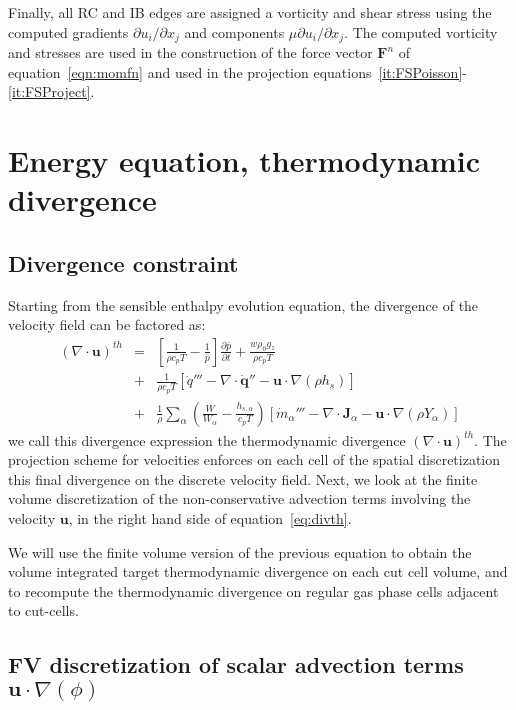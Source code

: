 Finally, all RC and IB edges are assigned a vorticity and shear stress using the computed gradients $\partial u_i/\partial x_j$ and components $\mu \partial u_i/\partial x_j$. The computed vorticity and stresses are used in the construction of the force vector $\mathbf{F}^n$ of equation~\eqref{eqn:momfn} and used in the projection equations~\eqref{it:FSPoisson}-\eqref{it:FSProject}.

\section{Energy equation, thermodynamic divergence}

\subsection{Divergence constraint}

Starting from the sensible enthalpy evolution equation, the divergence of the velocity field can be factored as:
%
\begin{eqnarray}
    ( \nabla \cdot \mathbf{u} )^{th} &=&
    \left[ \frac{1}{\rho c_p T} - \frac{1}{\bar{p}} \right]
    \frac{\partial \bar{p}}{\partial t} + \frac{w \rho_0 g_z}{\rho c_p T} \nonumber \\
    &+& \frac{1}{\rho c_p T} \left[ \dot{q}''' - \nabla \cdot \dot{\mathbf{q}}'' - \mathbf{u} \cdot \nabla (\rho h_s) \right] \nonumber \\
    &+& \frac{1}{\rho} \sum_\alpha \left( \frac{\overline{W}}{W_\alpha} - \frac{h_{s,\alpha}}{c_p T} \right) \left[ \dot{m}_\alpha''' - \nabla \cdot \mathbf{J}_\alpha - \mathbf{u} \cdot \nabla (\rho Y_\alpha) \right] \label{eq:divth}
\end{eqnarray}
%
we call this divergence expression the thermodynamic divergence $( \nabla \cdot \mathbf{u} )^{th}$. The projection scheme for velocities enforces on each cell of the spatial discretization this final divergence on the discrete velocity field.
Next, we look at the finite volume discretization of the non-conservative advection terms involving the velocity $\mathbf{u}$, in the right hand side of equation~\eqref{eq:divth}.

We will use the finite volume version of the previous equation to obtain the volume integrated target thermodynamic divergence on each cut cell volume, and to recompute the thermodynamic divergence on regular gas phase cells adjacent to cut-cells.


\subsection{FV discretization of scalar advection terms $\mathbf{u} \cdot \nabla (\phi)$}

